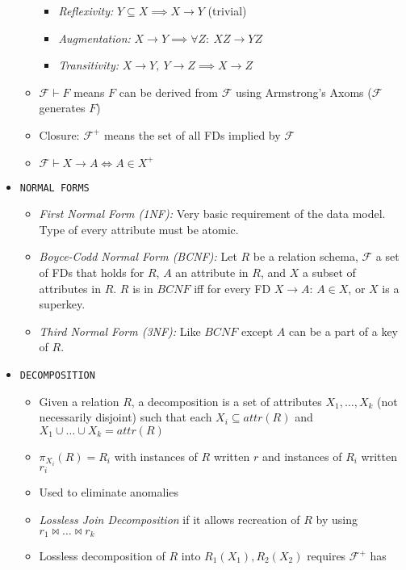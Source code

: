 \documentclass[landscape,8pt]{extarticle}
\newcommand{\code}{\lstinline}
\begin{document}
\begin{multicols}{4}
\begin{itemize}
\begin{itemize}
\begin{itemize}
            \item \emph{Reflexivity:} $Y \subseteq X \implies X \rightarrow Y$ (trivial)
            \item \emph{Augmentation:} $X \rightarrow Y \implies \forall Z:\ XZ \rightarrow YZ$
            \item \emph{Transitivity:} $X \rightarrow Y,\ Y \rightarrow Z \implies X \rightarrow Z$
        \end{itemize}
        \item $\mathcal{F} \vdash F$ means $F$ can be derived from $\mathcal{F}$ using Armstrong's
        Axoms ($\mathcal{F}$ generates $F$)
        \item Closure: $\mathcal{F}^+$ means the set of all FDs implied by $\mathcal{F}$
        \item $\mathcal{F} \vdash X \rightarrow A \iff A \in X^+$
    \end{itemize}
    \item \code{NORMAL FORMS}
    \begin{itemize}
        \item \emph{First Normal Form (1NF):} Very basic requirement of the data model. Type of
        every attribute must be atomic.
        \item \emph{Boyce-Codd Normal Form (BCNF):} Let $R$ be a relation schema, $\mathcal{F}$ a
        set of FDs that holds for $R$, $A$ an attribute in $R$, and $X$ a subset of attributes in
        $R$. $R$ is in $BCNF$ iff for every FD $X \rightarrow A$: $A \in X$, or $X$ is a superkey.
        \item \emph{Third Normal Form (3NF):} Like $BCNF$ except $A$ can be a part of a key of $R$.
    \end{itemize}
    \item \code{DECOMPOSITION}
    \begin{itemize}
        \item Given a relation $R$, a decomposition is a set of attributes $X_1, \dots, X_k$ (not
        necessarily disjoint) such that each $X_i \subseteq attr(R)$ and $X_1 \cup \dots \cup X_k =
        attr(R)$
        \item $\pi_{X_i}(R) = R_i$ with instances of $R$ written $r$ and instances of $R_i$ written $r_i$
        \item Used to eliminate anomalies
        \item \emph{Lossless Join Decomposition} if it allows recreation of $R$ by using $r_1
        \bowtie \dots \bowtie r_k$
        \item Lossless decomposition of $R$ into $R_1(X_1), R_2(X_2)$ requires $\mathcal{F}^+$ has

\end{itemize}
\end{itemize}
\end{multicols}
\end{document}
